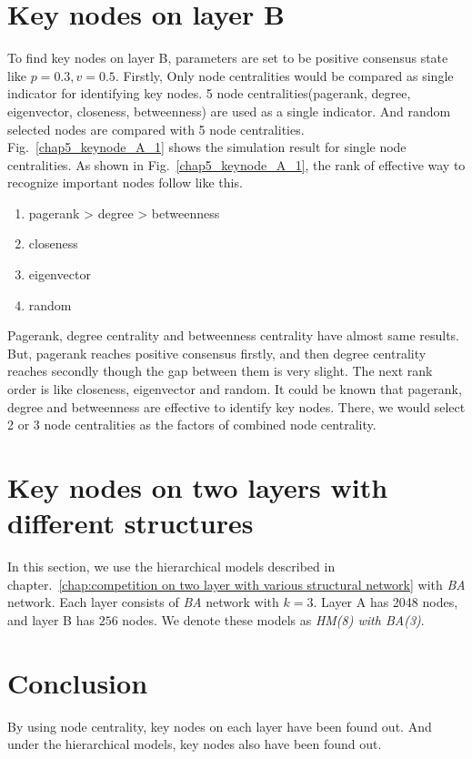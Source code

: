 \section{Key nodes on layer B}
To find key nodes on layer B, parameters are set to be positive consensus state like $p=0.3, v=0.5$. Firstly, Only node centralities would be compared as single indicator for identifying key nodes. 5 node centralities(pagerank, degree, eigenvector, closeness, betweenness) are used as a single indicator. And random selected nodes are compared with 5 node centralities. 
Fig.~\ref{chap5_keynode_A_1} shows the simulation result for single node centralities. As shown in Fig.~\ref{chap5_keynode_A_1}, the rank of effective way to recognize important nodes follow like this. 
\begin{enumerate}
	\item pagerank > degree > betweenness  
	\item closeness
	\item eigenvector       
	\item random
\end{enumerate}
Pagerank, degree centrality and betweenness centrality have almost same results. But, pagerank reaches positive consensus firstly, and then degree centrality reaches secondly though the gap between them is very slight. The next rank order is like closeness, eigenvector and random. It could be known that pagerank, degree and betweenness are effective to identify key nodes. There, we would select 2 or 3 node centralities as the factors of combined node centrality. 





\section{Key nodes on two layers with different structures}
In this section, we use the hierarchical models described in chapter.~\ref{chap:competition on two layer with various structural network} with \textit{BA} network. Each layer consists of \textit{BA} network with $k=3$. Layer A has 2048 nodes, and layer B has $256$ nodes. We denote these models as \textit{HM(8) with BA(3)}. 



\section{Conclusion}
By using node centrality, key nodes on each layer have been found out. 
And under the hierarchical models, key nodes also have been found out. 
